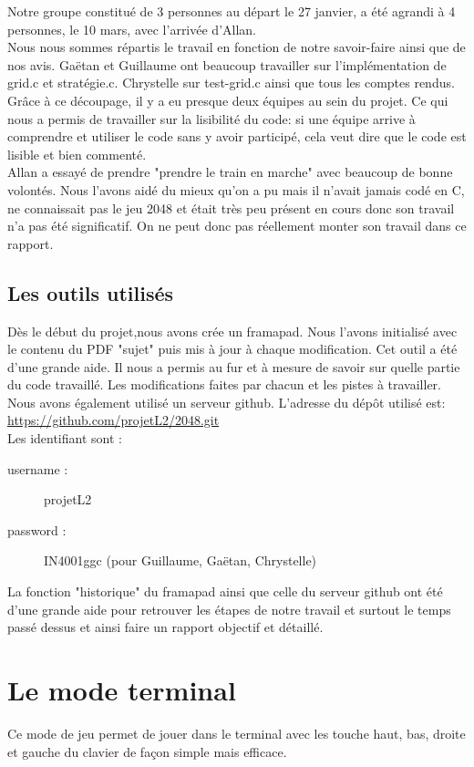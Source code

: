 \documentclass{report}
\begin{document}
Notre groupe constitué de 3 personnes au départ le 27 janvier, a été agrandi à 4 personnes, le 10 mars, avec l'arrivée d'Allan.\\ Nous nous sommes répartis le travail en fonction de notre savoir-faire ainsi que de nos avis. Gaëtan et Guillaume ont beaucoup travailler sur l'implémentation de grid.c et stratégie.c. Chrystelle sur test-grid.c ainsi que tous les comptes rendus. Grâce à ce découpage, il y a eu presque deux équipes au sein du projet. Ce qui nous a permis de travailler sur la lisibilité du code: si une équipe arrive à comprendre et utiliser le code sans y avoir participé, cela veut dire que le code est lisible et bien commenté.\\ Allan a essayé de prendre "prendre le train en marche" avec beaucoup de bonne volontés. Nous l'avons aidé du mieux qu'on a pu mais il n'avait jamais codé en C, ne connaissait pas le jeu 2048 et était très peu présent en cours donc son travail n'a pas été significatif. On ne peut donc pas réellement monter son travail dans ce rapport.
\section{Les outils utilisés}
Dès le début du projet,nous avons crée un framapad. Nous l'avons initialisé avec le contenu du PDF "sujet" puis mis à jour à chaque modification. Cet outil a été d'une grande aide. Il nous a permis au fur et à mesure de savoir sur quelle partie du code travaillé. Les modifications faites par chacun et les pistes à travailler. \\
Nous avons également utilisé un serveur github. L'adresse du dépôt utilisé est: \url{https://github.com/projetL2/2048.git} \\Les identifiant sont :
\begin{description}
\item [username : ] projetL2
\item [password : ] IN4001ggc  (pour Guillaume, Gaëtan, Chrystelle)
\end{description}
La fonction "historique" du framapad ainsi que celle du serveur github ont été d'une grande aide pour retrouver les étapes de notre travail et surtout le temps passé dessus et ainsi faire un rapport objectif et détaillé.

\chapter{Le mode terminal}
Ce mode de jeu permet de jouer dans le terminal avec les touche haut, bas, droite et gauche du clavier de façon simple mais efficace.
\end{document}
